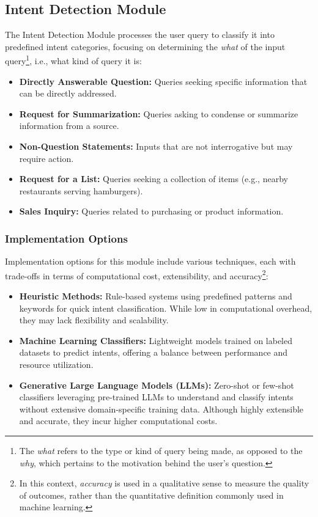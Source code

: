 \documentclass[sigconf,nonacm]{acmart}
\begin{document}
\subsection{Intent Detection Module}
The Intent Detection Module processes the user query to classify it into predefined intent categories, focusing on determining the \textit{what} of the input query\footnote{The \textit{what} refers to the type or kind of query being made, as opposed to the \textit{why}, which pertains to the motivation behind the user's question.}, i.e., what kind of query it is:
\begin{itemize}
    \item \textbf{Directly Answerable Question:} Queries seeking specific information that can be directly addressed.
    \item \textbf{Request for Summarization:} Queries asking to condense or summarize information from a source.
    \item \textbf{Non-Question Statements:} Inputs that are not interrogative but may require action.
    \item \textbf{Request for a List:} Queries seeking a collection of items (e.g., nearby restaurants serving hamburgers).
    \item \textbf{Sales Inquiry:} Queries related to purchasing or product information.
\end{itemize}


\subsubsection{Implementation Options}
Implementation options for this module include various techniques, each with trade-offs in terms of computational cost, extensibility, and accuracy\footnote{In this context, \textit{accuracy} is used in a qualitative sense to measure the quality of outcomes, rather than the quantitative definition commonly used in machine learning.}:
\begin{itemize}
    \item \textbf{Heuristic Methods:} Rule-based systems using predefined patterns and keywords for quick intent classification. While low in computational overhead, they may lack flexibility and scalability.
    \item \textbf{Machine Learning Classifiers:} Lightweight models trained on labeled datasets to predict intents, offering a balance between performance and resource utilization.
    \item \textbf{Generative Large Language Models (LLMs):} Zero-shot or few-shot classifiers leveraging pre-trained LLMs to understand and classify intents without extensive domain-specific training data. Although highly extensible and accurate, they incur higher computational costs.
\end{itemize}
\end{document}
